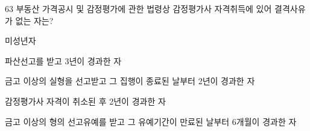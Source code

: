 \begin{question}{63}
부동산 가격공시 및 감정평가에 관한 법령상 감정평가사 자격취득에 있어 결격사유가 없는 자는?
\begin{choices}
  \item 미성년자
  \item 파산선고를 받고 3년이 경과한 자
  \item 금고 이상의 실형을 선고받고 그 집행이 종료된 날부터 2년이 경과한 자
  \item 감정평가사 자격이 취소된 후 2년이 경과한 자
  \item 금고 이상의 형의 선고유예를 받고 그 유예기간이 만료된 날부터 6개월이 경과한 자
\end{choices}
\end{question}
